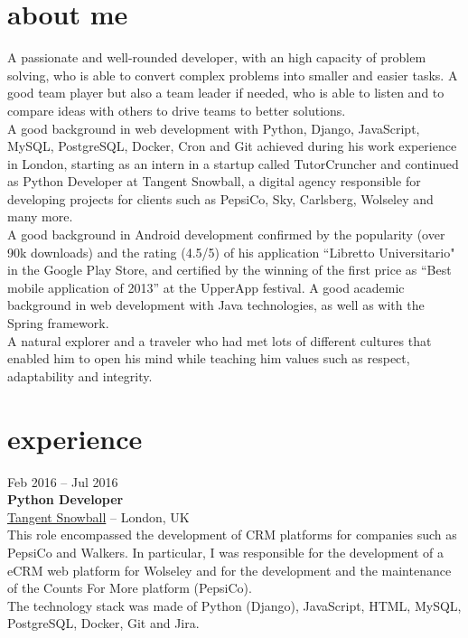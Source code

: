 \documentclass[]{friggeri-cv}
\begin{document}
\section{about me}
{
A passionate and well-rounded developer, with an high capacity of problem solving, who is able to convert complex problems into smaller and easier tasks. A good team player but also a team leader if needed, who is able to listen and to compare ideas with others to drive teams to better solutions. \\
A good background in web development with Python, Django, JavaScript, MySQL, PostgreSQL, Docker, Cron and Git achieved during his work experience in London, starting as an intern in a startup called TutorCruncher and continued as Python Developer at Tangent Snowball, a digital agency responsible for developing projects for clients such as PepsiCo, Sky, Carlsberg, Wolseley and many more. \\
A good background in Android development confirmed by the popularity (over 90k downloads) and the rating (4.5/5) of his application “Libretto Universitario" in the Google Play Store, and certified by the winning of the first price as “Best mobile application of 2013” at the UpperApp festival. A good academic background in web development with Java technologies, as well as with the Spring framework.
\\
A natural explorer and a traveler who had met lots of different cultures that enabled him to open his mind while teaching him values such as respect, adaptability and integrity.}


\section{experience}

{Feb 2016 -- Jul 2016} \\
{\textbf{Python Developer}} \\
{\href{http://www.tangentsnowball.com}{Tangent Snowball}} -- {London, UK} \\
{This role encompassed the development of CRM platforms for companies such as PepsiCo and Walkers. In particular, I was responsible for the development of a eCRM web platform for Wolseley and for the development and the maintenance of the Counts For More platform (PepsiCo). \\
The technology stack was made of Python (Django), JavaScript, HTML, MySQL, PostgreSQL, Docker, Git and Jira.}
\end{document}
